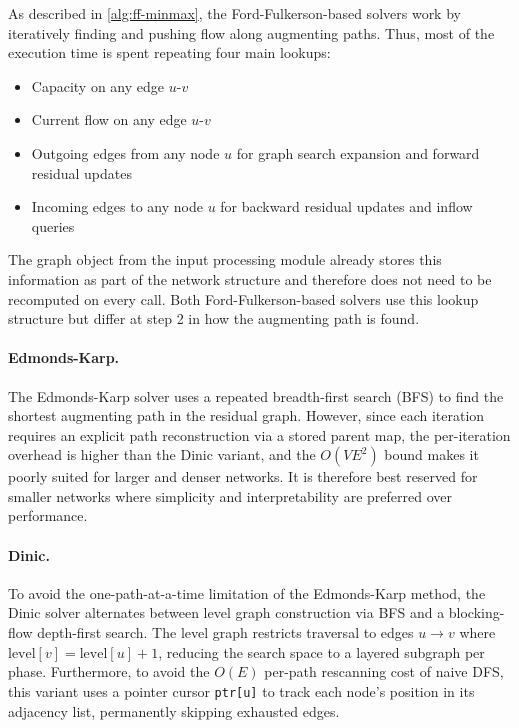 \documentclass[12pt]{report}
\begin{document}
As described in \ref{alg:ff-minmax}, the Ford-Fulkerson-based solvers work by iteratively finding and pushing flow along augmenting paths. Thus, most of the execution time is spent repeating four main lookups:

\begin{itemize}
\item Capacity on any edge $u$-$v$
\item Current flow on any edge $u$-$v$
\item Outgoing edges from any node $u$ for graph search expansion
and forward residual updates
\item Incoming edges to any node $u$ for backward residual updates
and inflow queries
\end{itemize}

The graph object from the input processing module already stores this information as
part of the network structure and therefore does not need to be
recomputed on every call. Both Ford-Fulkerson-based solvers use this lookup structure 
but differ at step 2 in how the augmenting path is found.

\paragraph{Edmonds-Karp.} 
The Edmonds-Karp solver uses a repeated breadth-first search (BFS) to find the shortest augmenting path in the residual graph. However, since each iteration requires an explicit path reconstruction via a stored parent map, the per-iteration overhead is higher than the Dinic variant, and the $O(VE^2)$ bound makes it poorly suited for larger and denser networks. It is therefore best reserved for smaller networks where simplicity and interpretability are preferred over performance.

\paragraph{Dinic.} 
To avoid the one-path-at-a-time limitation of the Edmonds-Karp method, the Dinic solver alternates between level graph construction via BFS and a blocking-flow depth-first search. The level graph restricts traversal to edges $u \to v$ where $\text{level}[v] = \text{level}[u] + 1$, reducing the search space to a layered subgraph per phase. Furthermore, to avoid the $O(E)$ per-path rescanning cost of naive DFS, this variant uses a pointer cursor \texttt{ptr[u]} to track each node's position in its adjacency list, permanently skipping exhausted edges. 
\end{document}
